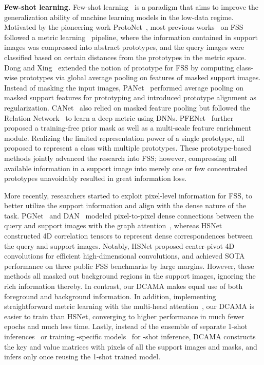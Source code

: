 \documentclass[runningheads,table,xcdraw]{llncs}
\begin{document}
\textbf{Few-shot learning.}
Few-shot learning~\cite{fei2006one} is a paradigm that aims to improve the generalization ability of machine learning models in the low-data regime.
Motivated by the pioneering work ProtoNet~\cite{snell2017prototypical}, most previous works~\cite{dong2018few,liu2020part,wang2019panet,yang2020prototype,zhang2019canet,zhang2020sg} on FSS followed a metric learning~\cite{dong2018few} pipeline, where the information contained in support images was compressed into abstract prototypes, and the query images were classified based on certain distances from the prototypes in the metric space.
Dong and Xing~\cite{dong2018few} extended the notion of prototype for FSS by computing class-wise prototypes via global average pooling on features of masked support images.
Instead of masking the input images, PANet~\cite{wang2019panet} performed average pooling on masked support features for prototyping and introduced prototype alignment as regularization.
CANet~\cite{zhang2019canet} also relied on masked feature pooling but followed the Relation Network~\cite{sung2018learning} to learn a deep metric using DNNs.
PFENet~\cite{tian2020prior} further proposed a training-free prior mask as well as a multi-scale feature enrichment module.
Realizing the limited representation power of a single prototype, \cite{cui2021unified,liu2020part,yang2020prototype,zhang2021self} all proposed to represent a class with multiple prototypes.
These prototype-based methods jointly advanced the research into FSS;
however, compressing all available information in a support image into merely one or few concentrated prototypes unavoidably resulted in great information loss.

More recently, researchers started to exploit pixel-level information for FSS, to better utilize the support information and align with the dense nature of the task.
PGNet~\cite{zhang2019pyramid} and DAN~\cite{wang2020few} modeled pixel-to-pixel dense connections between the query and support images with the graph attention~\cite{velivckovic2018graph}, whereas HSNet~\cite{min2021hypercorrelation} constructed 4D correlation tensors
to represent dense correspondences between the query and support images.
Notably, HSNet proposed center-pivot 4D convolutions
for efficient high-dimensional convolutions, and achieved SOTA performance on three public FSS benchmarks by large margins.
However, these methods all masked out background regions in the support images,
ignoring the rich information thereby.
In contrast, our DCAMA makes equal use of both foreground and background information.
In addition, implementing straightforward metric learning with the multi-head attention~\cite{vaswani2017attention}, our DCAMA is easier to train than HSNet, converging to higher performance in much fewer epochs and much less time.
Lastly, instead of the ensemble of separate 1-shot inferences~\cite{min2021hypercorrelation} or training -specific models~\cite{zhang2019canet} for -shot inference, DCAMA constructs the key and value matrices with pixels of all the support images and masks, and infers only once reusing the 1-shot trained model.
\end{document}
